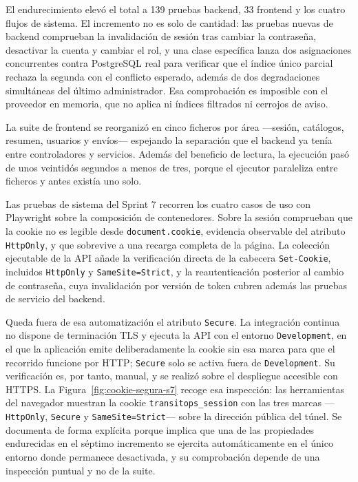 El endurecimiento elevó el total a 139 pruebas backend, 33 frontend y los cuatro flujos de sistema. El incremento no es solo de cantidad: las pruebas nuevas de backend comprueban la invalidación de sesión tras cambiar la contraseña, desactivar la cuenta y cambiar el rol, y una clase específica lanza dos asignaciones concurrentes contra PostgreSQL real para verificar que el índice único parcial rechaza la segunda con el conflicto esperado, además de dos degradaciones simultáneas del último administrador. Esa comprobación es imposible con el proveedor en memoria, que no aplica ni índices filtrados ni cerrojos de aviso.

La suite de frontend se reorganizó en cinco ficheros por área ---sesión, catálogos, resumen, usuarios y envíos--- espejando la separación que el backend ya tenía entre controladores y servicios. Además del beneficio de lectura, la ejecución pasó de unos veintidós segundos a menos de tres, porque el ejecutor paraleliza entre ficheros y antes existía uno solo.

Las pruebas de sistema del Sprint 7 recorren los cuatro casos de uso con Playwright sobre la composición de contenedores. Sobre la sesión comprueban que la cookie no es legible desde \texttt{document.cookie}, evidencia observable del atributo \texttt{HttpOnly}, y que sobrevive a una recarga completa de la página. La colección ejecutable de la API añade la verificación directa de la cabecera \texttt{Set-Cookie}, incluidos \texttt{HttpOnly} y \texttt{SameSite=Strict}, y la reautenticación posterior al cambio de contraseña, cuya invalidación por versión de token cubren además las pruebas de servicio del backend.

Queda fuera de esa automatización el atributo \texttt{Secure}. La integración continua no dispone de terminación TLS y ejecuta la API con el entorno \texttt{Development}, en el que la aplicación emite deliberadamente la cookie sin esa marca para que el recorrido funcione por HTTP; \texttt{Secure} solo se activa fuera de \texttt{Development}. Su verificación es, por tanto, manual, y se realizó sobre el despliegue accesible con HTTPS. La Figura~\ref{fig:cookie-segura-s7} recoge esa inspección: las herramientas del navegador muestran la cookie \texttt{transitops\_session} con las tres marcas ---\texttt{HttpOnly}, \texttt{Secure} y \texttt{SameSite=Strict}--- sobre la dirección pública del túnel. Se documenta de forma explícita porque implica que una de las propiedades endurecidas en el séptimo incremento se ejercita automáticamente en el único entorno donde permanece desactivada, y su comprobación depende de una inspección puntual y no de la suite.

